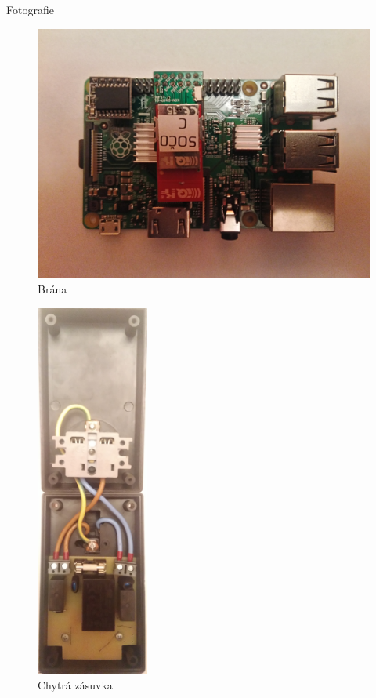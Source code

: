 \documentclass[11pt]{beamer}
\begin{document}
\begin{frame}{Fotografie}
  \begin{center}
      \begin{figure}
        \includegraphics[width = \textwidth]{../img/foto/brana.jpg}
        \caption{Brána}
      \end{figure}
    \endminipage
      \begin{figure}
        \includegraphics[width = 0.33\textwidth]{../img/foto/zasuvka.jpg}
        \caption{Chytrá zásuvka}
      \end{figure}
    \endminipage
  \end{center}
\end{frame}
\end{document}
